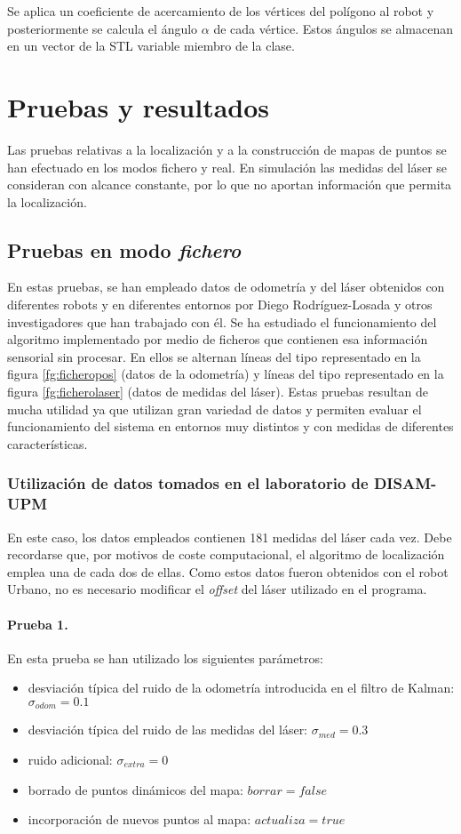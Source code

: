 Se aplica un coeficiente de acercamiento de los vértices del polígono al robot y posteriormente se calcula el ángulo $\alpha$ de cada vértice. Estos ángulos se almacenan en un vector  de la STL variable miembro de la clase.

\section{Pruebas y resultados}
Las pruebas relativas a la localización y a la construcción de mapas de puntos se han efectuado en los modos fichero y real. En simulación las medidas del láser se consideran con alcance constante, por lo que no aportan información que permita la localización.

\subsection{Pruebas en modo \emph{fichero}}
En estas pruebas, se han empleado datos de odometría y del láser obtenidos con diferentes robots y en diferentes entornos por Diego Rodríguez-Losada y otros investigadores que han trabajado con él. Se ha estudiado el funcionamiento del algoritmo implementado por medio de ficheros que contienen esa información sensorial sin procesar. En ellos se alternan líneas del tipo representado en la figura \ref{fg:ficheropos} (datos de la odometría) y líneas del tipo representado en la figura \ref{fg:ficherolaser} (datos de medidas del láser). Estas pruebas resultan de mucha utilidad ya que utilizan gran variedad de datos y permiten evaluar el funcionamiento del sistema en entornos muy distintos y con medidas de diferentes características.

\subsubsection{Utilización de datos tomados en el laboratorio de DISAM-UPM}
En este caso, los datos empleados contienen 181 medidas del láser cada vez. Debe recordarse que, por motivos de coste computacional, el algoritmo de localización emplea una de cada dos de ellas. Como estos datos fueron obtenidos con el robot Urbano, no es necesario modificar el \emph{offset} del láser utilizado en el programa.

\paragraph{Prueba 1.}
En esta prueba se han utilizado los siguientes parámetros:
\begin{itemize}
  \item desviación típica del ruido de la odometría introducida en el filtro de Kalman: $\sigma_{odom} = 0.1$
  \item desviación típica del ruido de las medidas del láser: $\sigma_{med} = 0.3$
  \item ruido adicional: $\sigma_{extra} = 0$
  \item borrado de puntos dinámicos del mapa: $borrar = false$
  \item incorporación de nuevos puntos al mapa: $actualiza = true$
\end{itemize}


